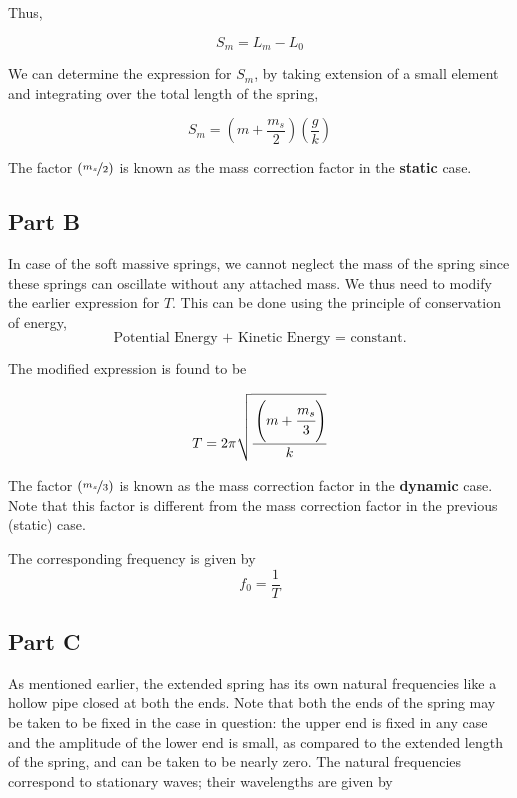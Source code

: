 Thus,

\begin{equation}
S_m = L_m - L_0
\end{equation}

We can determine the expression for $S_m$, by taking extension of a small element and integrating over the total length of the spring,

\begin{equation}
S_m = \left( m + \frac{m_s}{2} \right)\left(\frac{g}{k} \right)
\end{equation}

The factor $(\nicefrac{m_s}{2})$ is known as the mass correction factor in the \textbf{static} case.


\subsection*{Part B}
In case of the soft massive springs, we cannot neglect the mass of the spring since these springs can oscillate without any attached mass. We thus need to modify the earlier expression for $T$. This can be done using the principle of conservation of energy, $$\text{Potential Energy + Kinetic Energy = constant.}$$

The modified expression is found to be

\begin{equation}
T = 2\pi \sqrt{\cfrac{\left(m + \cfrac{m_s}{3}\right)}{k}}
\end{equation}

The factor $(\nicefrac{m_s}{3})$ is known as the mass correction factor in the \textbf{dynamic} case. Note that this factor is different from the mass correction factor in the previous (static) case.

The corresponding frequency is given by $$f_0 = \frac{1}{T}$$


\subsection*{Part C}

As mentioned earlier, the extended spring has its own natural frequencies like a hollow pipe closed at both the ends. Note that both the ends of the spring may be taken to be fixed in the case in question: the upper end is fixed in any case and the amplitude of the lower end is small, as compared to the extended length of the spring, and can be taken to be nearly zero. The natural frequencies correspond to stationary waves; their wavelengths are given by 

